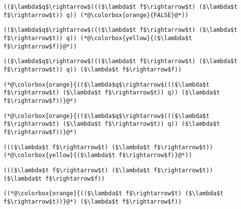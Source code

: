 \documentclass{beamer}
\begin{document}
\begin{frame}[fragile]{\CurrentSection}
\lstset{basicstyle=\ttfamily\small}\lstset{numbers=none}\lstset{language=ML}\begin{lstlisting}
(($\lambda$q$\rightarrow$((($\lambda$t f$\rightarrow$t) ($\lambda$t f$\rightarrow$t)) q)) (*@\colorbox{orange}{FALSE}@*))
\end{lstlisting}
\pause\lstset{language=ML}\begin{lstlisting}
(($\lambda$q$\rightarrow$((($\lambda$t f$\rightarrow$t) ($\lambda$t f$\rightarrow$t)) q)) (*@\colorbox{yellow}{($\lambda$t f$\rightarrow$f)}@*))
\end{lstlisting}

\end{frame}

\begin{frame}[fragile]{\CurrentSection}
\lstset{basicstyle=\ttfamily\small}\lstset{numbers=none}\lstset{language=ML}\begin{lstlisting}
(($\lambda$q$\rightarrow$((($\lambda$t f$\rightarrow$t) ($\lambda$t f$\rightarrow$t)) q)) ($\lambda$t f$\rightarrow$f))
\end{lstlisting}
\pause\lstset{language=ML}\begin{lstlisting}
(*@\colorbox{orange}{(($\lambda$q$\rightarrow$((($\lambda$t f$\rightarrow$t) ($\lambda$t f$\rightarrow$t)) q)) ($\lambda$t f$\rightarrow$f))}@*)
\end{lstlisting}

\end{frame}

\begin{frame}[fragile]{\CurrentSection}
\lstset{basicstyle=\ttfamily\small}\lstset{numbers=none}\lstset{language=ML}\begin{lstlisting}
(*@\colorbox{orange}{(($\lambda$q$\rightarrow$((($\lambda$t f$\rightarrow$t) ($\lambda$t f$\rightarrow$t)) q)) ($\lambda$t f$\rightarrow$f))}@*)
\end{lstlisting}
\pause\lstset{language=ML}\begin{lstlisting}
((($\lambda$t f$\rightarrow$t) ($\lambda$t f$\rightarrow$t)) (*@\colorbox{yellow}{($\lambda$t f$\rightarrow$f)}@*))
\end{lstlisting}

\end{frame}

\begin{frame}[fragile]{\CurrentSection}
\lstset{basicstyle=\ttfamily\small}\lstset{numbers=none}\lstset{language=ML}\begin{lstlisting}
((($\lambda$t f$\rightarrow$t) ($\lambda$t f$\rightarrow$t)) ($\lambda$t f$\rightarrow$f))
\end{lstlisting}
\pause\lstset{language=ML}\begin{lstlisting}
((*@\colorbox{orange}{(($\lambda$t f$\rightarrow$t) ($\lambda$t f$\rightarrow$t))}@*) ($\lambda$t f$\rightarrow$f))
\end{lstlisting}

\end{frame}
\end{document}
